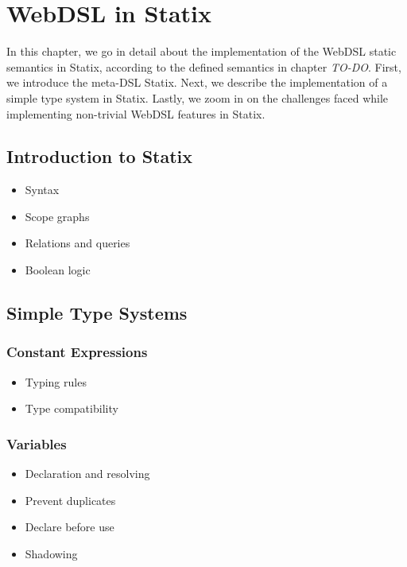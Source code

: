 
\chapter{\label{chap:statix}WebDSL in Statix}

  In this chapter, we go in detail about the implementation of the WebDSL static semantics in Statix, according to the defined semantics in chapter \emph{TO-DO}. First, we introduce the meta-DSL Statix. Next, we describe the implementation of a simple type system in Statix. Lastly, we zoom in on the challenges faced while implementing non-trivial WebDSL features in Statix.

  \section{Introduction to Statix}

    \begin{itemize}
      \item Syntax
      \item Scope graphs
      \item Relations and queries
      \item Boolean logic
    \end{itemize}
  
  \section{Simple Type Systems}

    \subsection{Constant Expressions}

      \begin{itemize}
        \item Typing rules
        \item Type compatibility
      \end{itemize}

    \subsection{Variables}

      \begin{itemize}
        \item Declaration and resolving
        \item Prevent duplicates
        \item Declare before use
        \item Shadowing
      \end{itemize}

